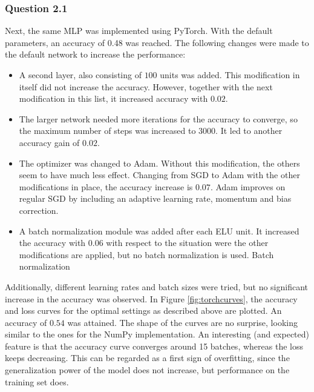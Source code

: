 \documentclass{article}
\begin{document}
\subsubsection*{Question 2.1}
Next, the same MLP was implemented using PyTorch. With the default parameters, an accuracy of 0.48 was reached. The following changes were made to the default network to increase the performance:
\begin{itemize}
	\item A second layer, also consisting of $100$ units was added. This modification in itself did not increase the accuracy. However, together with the next modification in this list, it increased accuracy with $0.02$.
	\item The larger network needed more iterations for the accuracy to converge, so the maximum number of steps was increased to $3000$. It led to another accuracy gain of $0.02$.
	\item The optimizer was changed to Adam. Without this modification, the others seem to have much less effect. Changing from SGD to Adam with the other modifications in place, the accuracy increase is $0.07$. Adam improves on regular SGD by including an adaptive learning rate, momentum and bias correction.
	\item A batch normalization module was added after each ELU unit. It increased the accuracy with $0.06$ with respect to the situation were the other modifications are applied, but no batch normalization is used. Batch normalization 
\end{itemize}
Additionally, different learning rates and batch sizes were tried, but no significant increase in the accuracy was observed. In Figure \ref{fig:torchcurves}, the accuracy and loss curves for the optimal settings as described above are plotted. An accuracy of $0.54$ was attained. The shape of the curves are no surprise, looking similar to the ones for the NumPy implementation. An interesting (and expected) feature is that the accuracy curve converges around 15 batches, whereas the loss keeps decreasing. This can be regarded as a first sign of overfitting, since the generalization power of the model does not increase, but performance on the training set does. 
\end{document}
